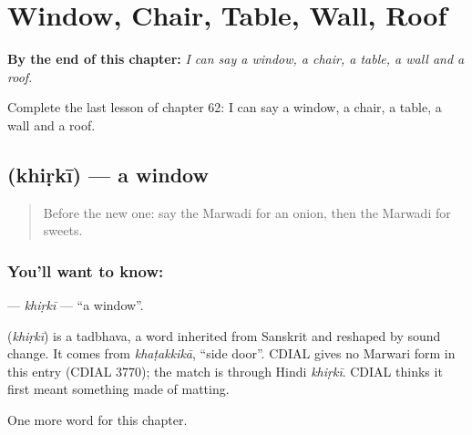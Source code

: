 
\chapter{Window, Chair, Table, Wall, Roof}
\label{ch:mw-window-chair-table-wall-roof}

\begin{chapteropening}
\textbf{By the end of this chapter:} \emph{I can say a window, a chair, a table, a wall and a roof.}

Complete the last lesson of chapter 62: I can say a window, a chair, a table, a wall and a roof.
\end{chapteropening}

\section[\texorpdfstring{\mw{खिड़की} (khiṛkī)}{खिड़की (khiṛkī)}]{ (khiṛkī) — a window}

\label{lesson:MW-C62-khirki}



\begin{quote}
Before the new one: say the Marwadi for an onion, then the Marwadi for sweets.
\end{quote}

\subsection*{You'll want to know: }
\textbf{} — \emph{khiṛkī} — \textquotedblleft{}a window\textquotedblright{}.

\begin{cousinweb}
\textbf{} (\emph{khiṛkī}) is a tadbhava, a word inherited from Sanskrit and reshaped by sound change. It comes from \emph{khaṭakkikā}, \textquotedblleft{}side door\textquotedblright{}. CDIAL gives no Marwari form in this entry (CDIAL 3770); the match is through Hindi \emph{khiṛkī}. CDIAL thinks it first meant something made of matting.
\end{cousinweb}

\begin{grammarlens}[title={What you've built}]
One more word for this chapter.
\end{grammarlens}


